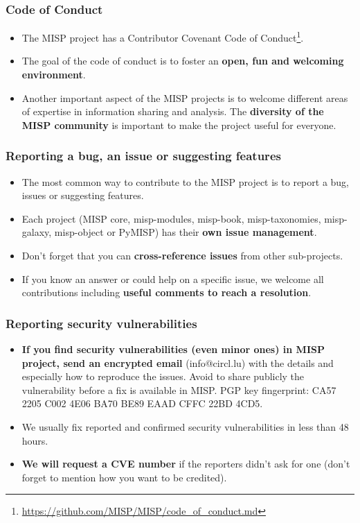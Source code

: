 
\begin{frame}[t,plain]
\titlepage
\end{frame}

\begin{frame}[t,plain]
\frametitle{Code of Conduct}
\begin{itemize}
\item The MISP project has a Contributor Covenant Code of Conduct\footnote{\url{https://github.com/MISP/MISP/code_of_conduct.md}}.
\item The goal of the code of conduct is to foster an {\bf open, fun and welcoming environment}.
\item Another important aspect of the MISP projects is to welcome different areas of expertise in information sharing and analysis. The {\bf diversity of the MISP community} is important to make the project useful for everyone.
\end{itemize}
\end{frame}

\begin{frame}[t,plain]
\frametitle{Reporting a bug, an issue or suggesting features}
\begin{itemize}
\item The most common way to contribute to the MISP project is to report a bug, issues or suggesting features.
\item Each project (MISP core, misp-modules, misp-book, misp-taxonomies, misp-galaxy, misp-object or PyMISP) has their {\bf own issue management}.
\item Don't forget that you can {\bf cross-reference issues} from other sub-projects.
\item If you know an answer or could help on a specific issue, we welcome all contributions including {\bf useful comments to reach a resolution}.
\end{itemize}
\end{frame}

\begin{frame}[t,plain]
\frametitle{Reporting security vulnerabilities}
\begin{itemize}
\item {\bf If you find security vulnerabilities (even minor ones) in MISP project, send an encrypted email} (info@circl.lu) with the details and especially how to reproduce the issues. Avoid to share publicly the vulnerability before a fix is available in MISP. PGP key fingerprint: CA57 2205 C002 4E06 BA70 BE89 EAAD CFFC 22BD 4CD5.
\item We usually fix reported and confirmed security vulnerabilities in less than 48 hours.
\item {\bf We will request a CVE number} if the reporters didn't ask for one (don't forget to mention how you want to be credited).
\end{itemize}
\end{frame}


